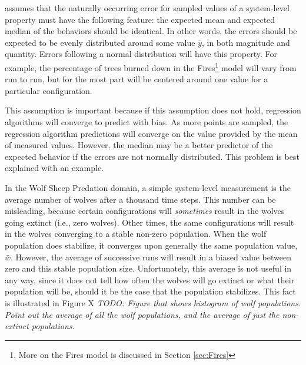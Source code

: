 \fw assumes that the naturally occurring error for sampled values of a system-level property must have the following feature: the expected mean and expected median of the behaviors should be identical.
In other words, the errors should be expected to be evenly distributed around some value $\bar y$, in  both magnitude and quantity.
Errors following a normal distribution will have this property.
For example, the percentage of trees burned down in the Fires\footnote{More on the Fires model is discussed in Section \ref{sec:Fires}} model will vary from run to run, but for the most part will be centered around one value for a particular configuration.

This assumption is important because if this assumption does not hold, regression algorithms will converge to predict with bias.
As more points are sampled, the regression algorithm predictions will converge on the value provided by the mean of measured values.
However, the median may be a better predictor of the expected behavior if the errors are not normally distributed.
This problem is best explained with an example.

In the Wolf Sheep Predation domain, a simple system-level measurement is the average number of wolves after a thousand time steps.
This number can be misleading, because certain configurations will \textit{sometimes} result in the wolves going extinct (i.e., zero wolves).
Other times, the same configurations will result in the wolves converging to a stable non-zero population.
When the wolf population does stabilize, it converges upon generally the same population value, $\bar w$.
However, the average of successive runs will result in a biased value between zero and this stable population size.
Unfortunately, this average is not useful in any way, since it does not tell how often the wolves will go extinct or what their population will be, should it be the case that the population stabilizes.
This fact is illustrated in Figure X \textit{TODO: Figure that shows histogram of wolf populations. Point out the average of all the wolf populations, and the average of just the non-extinct populations}.

